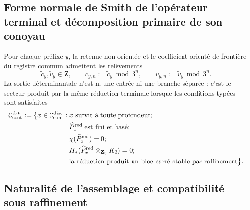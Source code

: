 \subsection{Forme normale de Smith de l'opérateur terminal et décomposition primaire de son conoyau}
Pour chaque préfixe \(y\), la retenue non orientée et le coefficient orienté de frontière du registre commun admettent les relèvements
\begin{equation}
\label{eq:detint-c-v-lifts}
 \widetilde c_y,\widetilde v_y\in\mathbf Z,\qquad
 c_{y,n}:=\widetilde c_y\bmod3^n,\qquad
 v_{y,n}:=\widetilde v_y\bmod3^n.
\end{equation}
La sortie déterminantale n'est ni une entrée ni une branche séparée : c'est le secteur produit par la même réduction terminale lorsque les conditions typées sont satisfaites
\begin{equation}
\label{eq:detint-dominio}
\begin{split}
 \mathcal C_{\rm cont}^{\rm det}:=\bigl\{x\in\mathcal C_{\rm cont}^{\rm disc}:{}&
 x\text{ survit à toute profondeur};\\
 &\widehat P_x^{\rm red}\text{ est fini et basé};\\
 &\chi(\widehat P_x^{\rm red})=0;\\
 &H_*(\widehat P_x^{\rm red}\otimes_{\mathbf Z_3}K_3)=0;\\
 &\text{la réduction produit un bloc carré stable par raffinement}
 \bigr\}.
\end{split}
\end{equation}
\begingroup
  \let\section\subsection
  
\endgroup

\section{Naturalité de l'assemblage et compatibilité sous raffinement}

